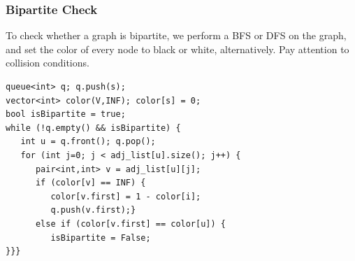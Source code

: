 \documentclass{beamer}
\begin{document}
\begin{frame}
  \frametitle{Bipartite Check}
  {\smaller
  To check whether a graph is bipartite, we perform a BFS or DFS on the graph, 
  and set the color of every node to black or white, alternatively. Pay 
  attention to collision conditions.

  \begin{exampleblock}{}
\begin{verbatim}
queue<int> q; q.push(s);
vector<int> color(V,INF); color[s] = 0;
bool isBipartite = true;
while (!q.empty() && isBipartite) {
   int u = q.front(); q.pop();
   for (int j=0; j < adj_list[u].size(); j++) {
      pair<int,int> v = adj_list[u][j];
      if (color[v] == INF) {
         color[v.first] = 1 - color[i];
         q.push(v.first);}
      else if (color[v.first] == color[u]) {
         isBipartite = False; 
}}}
\end{verbatim}
  \end{exampleblock}
  }
\end{frame}
\end{document}
